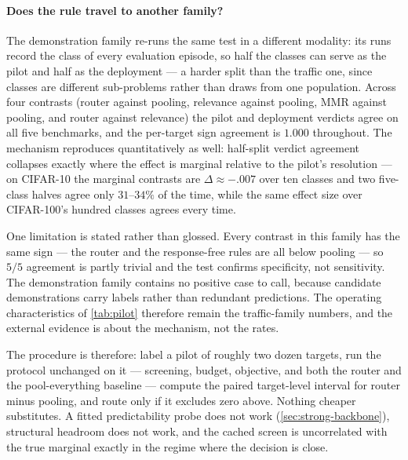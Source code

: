 \paragraph{Does the rule travel to another family?} The demonstration family
re-runs the same test in a different modality: its runs record the class of every
evaluation episode, so half the classes can serve as the pilot and half as the
deployment --- a harder split than the traffic one, since classes are different
sub-problems rather than draws from one population. Across four contrasts (router
against pooling, relevance against pooling, MMR against pooling, and router
against relevance) the pilot and deployment verdicts agree on all five
benchmarks, and the per-target sign agreement is $1.000$ throughout. The
mechanism reproduces quantitatively as well: half-split verdict agreement
collapses exactly where the effect is marginal relative to the pilot's
resolution --- on CIFAR-10 the marginal contrasts are $\Delta\approx-.007$ over
ten classes and two five-class halves agree only $31$--$34\%$ of the time, while
the same effect size over CIFAR-100's hundred classes agrees every time.

One limitation is stated rather than glossed. Every contrast in this family has
the same sign --- the router and the response-free rules are all below pooling
--- so $5/5$ agreement is partly trivial and the test confirms specificity, not
sensitivity. The demonstration family contains no positive case to call, because
candidate demonstrations carry labels rather than redundant predictions. The
operating characteristics of \cref{tab:pilot} therefore remain the traffic-family
numbers, and the external evidence is about the mechanism, not the rates.

The procedure is therefore: label a pilot of roughly two dozen targets, run the
protocol unchanged on it --- screening, budget, objective, and both the router
and the pool-everything baseline --- compute the paired target-level interval
for router minus pooling, and route only if it excludes zero above. Nothing
cheaper substitutes. A fitted predictability probe does not work
(\cref{sec:strong-backbone}), structural headroom does not work, and the cached
screen is uncorrelated with the true marginal exactly in the regime where the
decision is close.


